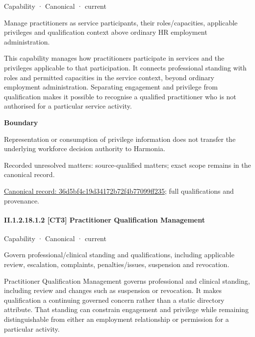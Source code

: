 \label{element:36d5bf4c19d34172b72f4b77099ff235}
{\small Capability · Canonical · current}\par

Manage practitioners as service participants, their roles/capacities, applicable privileges and qualification context above ordinary HR employment administration.



This capability manages how practitioners participate in services and the privileges applicable to that participation. It connects professional standing with roles and permitted capacities in the service context, beyond ordinary employment administration. Separating engagement and privilege from qualification makes it possible to recognise a qualified practitioner who is not authorised for a particular service activity.



\textbf{Boundary}



Representation or consumption of privilege information does not transfer the underlying workforce decision authority to Harmonia.


{\small Recorded unresolved matters: source-qualified matters; exact scope remains in the canonical record.}\par
{\footnotesize \href{../../../../../../../continuum/strategy/capability/36d5bf4c19d34172b72f4b77099ff235.md}{Canonical record: 36d5bf4c19d34172b72f4b77099ff235}; full qualifications and provenance.}\par
\paragraph*{II.1.2.18.1.2 [CT3] Practitioner Qualification Management}
\label{navigation:II.1.2.18.1.2}

\label{element:279bab5de1b74c17a5ee2db5cae8d385}
{\small Capability · Canonical · current}\par

Govern professional/clinical standing and qualifications, including applicable review, escalation, complaints, penalties/issues, suspension and revocation.



Practitioner Qualification Management governs professional and clinical standing, including review and changes such as suspension or revocation. It makes qualification a continuing governed concern rather than a static directory attribute. That standing can constrain engagement and privilege while remaining distinguishable from either an employment relationship or permission for a particular activity.



